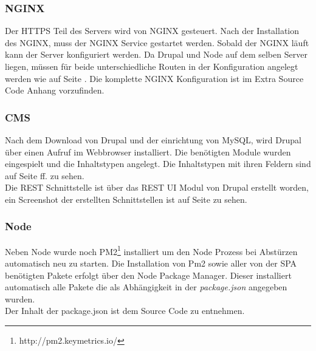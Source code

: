 \documentclass[11pt,a4paper]{article}
\begin{document}
\subsubsection{NGINX}
Der HTTPS Teil des Servers wird von NGINX gesteuert. Nach der Installation des NGINX, muss der NGINX Service gestartet werden. Sobald der NGINX läuft kann der Server konfiguriert werden. Da Drupal und Node auf dem selben Server liegen, müssen für beide unterschiedliche Routen in der Konfiguration angelegt werden wie auf Seite \pageref{sec:nginx}. Die komplette NGINX Konfiguration ist im Extra Source Code Anhang vorzufinden.
\subsubsection{CMS}
Nach dem Download von Drupal und der einrichtung von MySQL, wird Drupal über einen Aufruf im Webbrowser installiert. Die benötigten Module wurden eingespielt und die Inhaltstypen angelegt.
Die Inhaltstypen mit ihren Feldern sind auf Seite \pageref{sec:content} ff. zu sehen.\\
Die REST Schnittstelle ist über das REST \acs{UI} Modul von Drupal erstellt worden, ein Screenshot der erstellten Schnittstellen ist auf Seite \pageref{sec:rest} zu sehen.
\subsubsection{Node}
Neben Node wurde noch PM2\footnote{http://pm2.keymetrics.io/} installiert um den Node Prozess bei Abstürzen automatisch neu zu starten. Die Installation von Pm2 sowie aller von der SPA benötigten Pakete erfolgt über den Node Package Manager. Dieser installiert automatisch alle Pakete die als Abhängigkeit  in der \textit{package.json} angegeben wurden.\\ Der Inhalt der package.json ist dem Source Code zu entnehmen.
\end{document}
